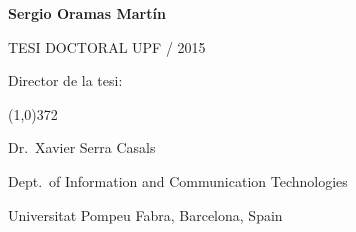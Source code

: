 \begin{titlingpage}
\begin{flushright}
  \vspace*{2cm}

  {\Large \textbf{Sergio Oramas Martín}}

   
  \vspace*{\fill} 
  TESI DOCTORAL UPF / 2015

\end{flushright}
  
  \vspace*{1.5cm}

  Director de la tesi:

  \vspace*{-0.25cm}

  \line(1,0){372}
  
  \vspace*{0.25cm}

  Dr.~Xavier Serra Casals

  Dept.~of Information and Communication Technologies

  Universitat Pompeu Fabra, Barcelona, Spain
  
\end{titlingpage}

